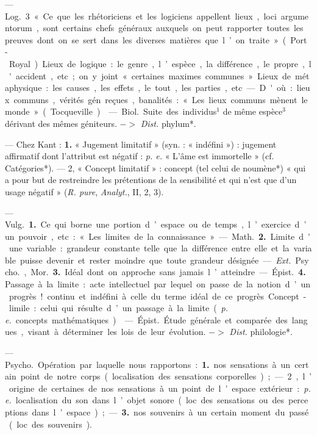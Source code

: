 \begin{itemize}[leftmargin=1cm, label=, itemsep=1pt]
— \si{Log.} 3 « Ce que les rhétoriciens et les logiciens appellent lieux,
loci argumentorum, sont certains
chefs généraux auxquels on peut
rapporter toutes les preuves dont
on se sert dans les diverses matières
que l’on traite » (Port-Royal). Lieux
de logique : le genre, l’espèce, la différence, le propre, l'accident, etc.; on
y joint « certaines maximes communes ». Lieux de métaphysique : les
causes, les effets, le tout, les parties, etc. — D'où : lieux communs,
vérités gén. reçues, banalités : « Les
lieux communs mènent le monde »
(Tocqueville).

 — \si{Biol.} Suite des individus$^1$
de même espèce$^3$ dérivant des
mêmes géniteurs. $->$ {\it {\it Dist.}} phylum*.

 — Chez Kant : {\bf 1.} « Jugement limitatif » (syn. : « indéfini ») :
jugement affirmatif dont l’attribut
est négatif : {\it p. e.} « L’âme est immortelle » (cf. Catégories*). — 2, « Concept limitatif » : concept (tel celui de
noumène*) « qui a pour but de restreindre les prétentions de la sensibilité et qui n’est que d'un usage
négatif » ({\it R. pure}, {\it Analyt.}, II, 2, 3).

 — \si{Vulg.} {\bf 1.} Ce qui borne une
portion d’espace ou de temps, l’exercice d’un pouvoir, etc. : « Les limites
de la connaissance ».

— \si{Math.} {\bf 2.} Limite d'une variable :
grandeur constante telle que la
différence entre elle et la variable
puisse devenir et rester moindre que
toute grandeur désignée.

— {\it Ext.} \si{Psycho.}, \si{Mor.} {\bf 3.} Idéal dont
on approche sans jamais l’atteindre.
— \si{Épist.} {\bf 4.} Passage à la limite :
acte intellectuel par lequel on passe
de la notion d’un progrès! continu
et indéfini à celle du terme idéal de
ce progrès. Concept-limile : celui qui
résulte d’un passage à la limite ({\it p. e.}
concepts mathématiques).

 — \si{Épist.} Étude générale
et comparée des langues, visant à
déterminer les lois de leur évolution.
 $->$ {\it {\it Dist.}} philologie*.

 — \si{Psycho.} Opération
par laquelle nous rapportons : {\bf 1.}
nos sensations à un certain point de
notre corps (localisation des sensations corporelles) ; — 2, l’origine
de certaines de nos sensations à un
point de l’espace extérieur : {\it p. e.}
localisation du son dans l’objet sonore (loc. des sensations ou des perceptions dans l’espace) ; — {\bf 3.} nos
souvenirs à un certain moment du
passé (loc. des souvenirs).


\end{itemize}
